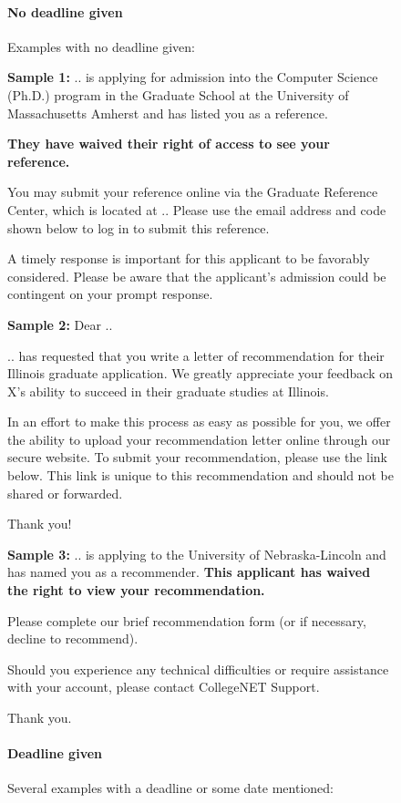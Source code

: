 \documentclass[oneside,11pt,dvipsnames]{book}
\newenvironment{emphasisbox}[1][]{
  \small
  \begin{myemphasisbox}
    {\small \textbf{#1}}
  }{
  \end{myemphasisbox}
}
\begin{document}
\begin{figure}
\begin{emphasisbox}
    \footnotesize
    \paragraph{No deadline given} Examples with no deadline given:

    \textbf{Sample 1:}
    .. is applying for admission into the Computer Science (Ph.D.) program in the Graduate School at the University of Massachusetts Amherst and has listed you as a reference.
    
    \textbf{They have waived their right of access to see your reference.}
    
    You may submit your reference online via the Graduate Reference Center, which is located at .. Please use the email address and code shown below to log in to submit this reference.
    
    A timely response is important for this applicant to be favorably considered. Please be aware that the applicant's admission could be contingent on your prompt response.
    
    \textbf{Sample 2:}
    Dear ..
    
    .. has requested that you write a letter of recommendation for their Illinois graduate application. We greatly appreciate your feedback on X's ability to succeed in their graduate studies at Illinois.
    
    In an effort to make this process as easy as possible for you, we offer the ability to upload your recommendation letter online through our secure website. To submit your recommendation, please use the link below. This link is unique to this recommendation and should not be shared or forwarded.
    
    Thank you!
    
    \textbf{Sample 3:}
    .. is applying to the University of Nebraska-Lincoln and has named you as a recommender. \textbf{This applicant has waived the right to view your recommendation.}
    
    Please complete our brief recommendation form (or if necessary, decline to recommend).
    
    Should you experience any technical difficulties or require assistance with your account, please contact CollegeNET Support.
    
    Thank you.
    
    \paragraph{Deadline given} Several examples with a deadline or some date mentioned:
    

\end{emphasisbox}
\end{figure}
\end{document}
